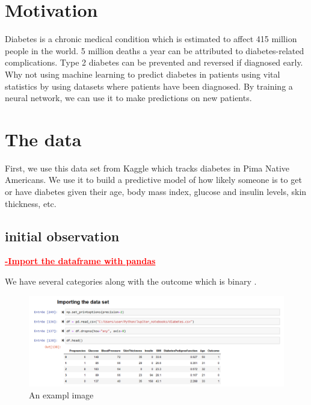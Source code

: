 \section{Motivation}
\label{chap:Motivation}


Diabetes is a chronic medical condition which is estimated to affect 415 million people in the world.
 5 million deaths a year can be attributed to diabetes-related complications.
Type 2 diabetes can be prevented and reversed if diagnosed early.
Why not using machine learning to predict diabetes in patients using vital 
statistics by using datasets where patients have been diagnosed. By training a neural network,
we can use it to make predictions on new patients.
\\

\section{The data}
\label{chap:data}
First, we use this data set from Kaggle which tracks diabetes in Pima Native Americans.
 We use it to build a predictive model of how likely someone is to get or have diabetes given their age,
  body mass index, glucose and insulin levels, skin thickness, etc.

\subsection{initial observation}
\label{sec:data}

 
\hspace{1cm}\textcolor{red}{\textbf{\underline{{-Import the dataframe with pandas}}\\
}}

We have several categories along with the outcome which is  binary .

\begin{figure}[htp]
    \centering
    \includegraphics[width=1.5\textwidth]{images/dataframe.png}
    \caption{An exampl image}
    \label{fig:example1}
\end{figure}


